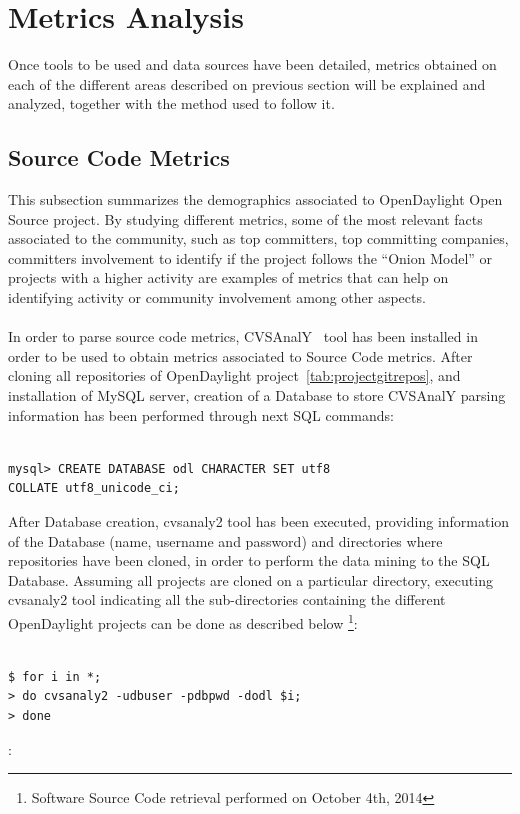 \documentclass[a4paper, 12pt]{book}
\begin{document}
\section{Metrics Analysis}
\label{sec:odl_metrics_analysis}
Once tools to be used and data sources have been detailed, metrics obtained on each of the different areas described on previous section will be explained and analyzed, together with the method used to follow it.

\subsection{Source Code Metrics}
\label{subsec:odl_metrics_source_code}
This subsection summarizes the demographics associated to OpenDaylight Open Source project. By studying different metrics, some of the most relevant facts associated to the community, such as top committers, top committing companies, committers involvement to identify if the project follows the ``Onion Model'' or projects with a higher activity are examples of metrics that can help on identifying activity or community involvement among other aspects.\\
\\
In order to parse source code metrics, CVSAnalY~\cite{CVSAnalY} tool has been installed in order to be used to obtain metrics associated to Source Code metrics. After cloning all repositories of OpenDaylight project~\ref{tab:projectgitrepos}, and installation of MySQL server, creation of a Database to store CVSAnalY parsing information has been performed through next SQL commands:
\begin{verbatim}

mysql> CREATE DATABASE odl CHARACTER SET utf8
COLLATE utf8_unicode_ci;

\end{verbatim}
After Database creation, cvsanaly2 tool has been executed, providing information of the Database (name, username and password) and directories where repositories have been cloned, in order to perform the data mining to the SQL Database. Assuming all projects are cloned on a particular directory, executing cvsanaly2 tool indicating all the sub-directories containing the different OpenDaylight projects can be done as described below \footnote{Software Source Code retrieval performed on October 4th, 2014}:
\begin{verbatim}

$ for i in *;
> do cvsanaly2 -udbuser -pdbpwd -dodl $i;
> done

\end{verbatim}
:
\end{document}
